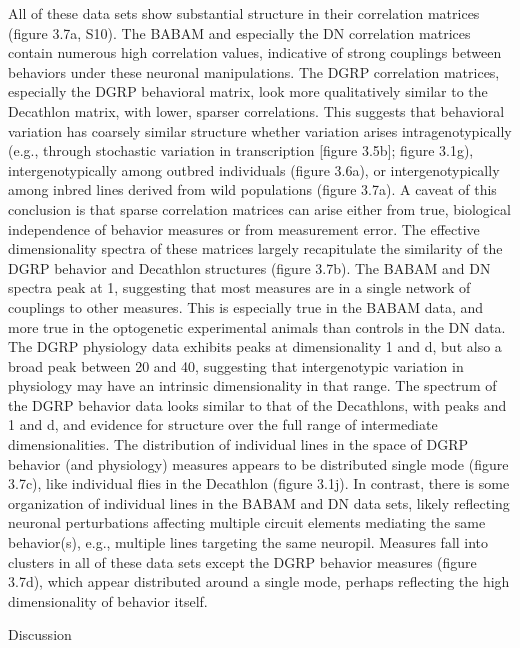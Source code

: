 \documentclass[12pt,letterpaper]{article}
\begin{document}
All of these data sets show substantial structure in their correlation matrices (figure 3.7a, S10). The BABAM and especially the DN correlation matrices contain numerous high correlation values, indicative of strong couplings between behaviors under these neuronal manipulations. The DGRP correlation matrices, especially the DGRP behavioral matrix, look more qualitatively similar to the Decathlon matrix, with lower, sparser correlations. This suggests that behavioral variation has coarsely similar structure whether variation arises intragenotypically (e.g., through stochastic variation in transcription [figure 3.5b]; figure 3.1g), intergenotypically among outbred individuals (figure 3.6a), or intergenotypically among inbred lines derived from wild populations (figure 3.7a). A caveat of this conclusion is that sparse correlation matrices can arise either from true, biological independence of behavior measures or from measurement error. The effective dimensionality spectra of these matrices largely recapitulate the similarity of the DGRP behavior and Decathlon structures (figure 3.7b). The BABAM and DN spectra peak at 1, suggesting that most measures are in a single network of couplings to other measures. This is especially true in the BABAM data, and more true in the optogenetic experimental animals than controls in the DN data. The DGRP physiology data exhibits peaks at dimensionality 1 and d, but also a broad peak between 20 and 40, suggesting that intergenotypic variation in physiology may have an intrinsic dimensionality in that range. The spectrum of the DGRP behavior data looks similar to that of the Decathlons, with peaks and 1 and d, and evidence for structure over the full range of intermediate dimensionalities. The distribution of individual lines in the space of DGRP behavior (and physiology) measures appears to be distributed single mode (figure 3.7c), like individual flies in the Decathlon (figure 3.1j). In contrast, there is some organization of individual lines in the BABAM and DN data sets, likely reflecting neuronal perturbations affecting multiple circuit elements mediating the same behavior(s), e.g., multiple lines targeting the same neuropil. Measures fall into clusters in all of these data sets except the DGRP behavior measures (figure 3.7d), which appear distributed around a single mode, perhaps reflecting the high dimensionality of behavior itself. 


Discussion
\end{document}
